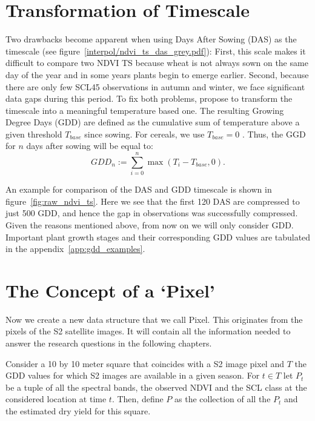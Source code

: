 \section{Transformation of Timescale}\label{sec:gdd_def}
	{%
		Two drawbacks become apparent when using Days After Sowing (DAS) as the timescale (see figure~\ref{interpol/ndvi_ts_das_grey.pdf}): First, this scale makes it difficult to compare two NDVI {TS} because wheat is not always sown on the same day of the year and in some years plants begin to emerge earlier. Second, because there are only few SCL45 observations in autumn and winter, we face significant data gaps during this period. To fix both problems, \cite{mcmasterGrowingDegreedaysOne1997} propose to transform the timescale into a meaningful temperature based one. The resulting Growing Degree Days ({GDD}) are defined as the cumulative sum of temperature above a given threshold $T_{base}$ since sowing. For cereals, we use $T_{base}=0$ \citep{holzkamperSpatialTemporalTrends2015}. Thus, the GGD for $n$ days after sowing will be equal to:
		\begin{equation}
			\label{eq:gdd}
			GDD_n := \sum_{i=0}^n \max(T_i - T_{base}, 0).
		\end{equation}

        An example for comparison of the DAS and GDD timescale is shown in figure~\ref{fig:raw_ndvi_ts}. Here we see that the first 120 DAS are compressed to just 500 GDD, and hence the gap in observations was successfully compressed. Given the reasons mentioned above, from now on we will only consider GDD. 
        Important plant growth stages and their corresponding GDD values are tabulated in the appendix~\ref{app:gdd_examples}.
	} 

\section{The Concept of a `Pixel'}{ \label{sec:gather_data_to_pixel}
	Now we create a new data structure that we call Pixel. This originates from the pixels of the S2 satellite images. It will contain all the information needed to answer the research questions in the following chapters. 
		
		Consider a 10 by 10 meter square that coincides with a S2 image pixel and $T$ the GDD values for which S2 images are available in a given season. For $t\in T$ let $P_t$ be a tuple of all the spectral bands, the observed NDVI and the SCL class at the considered location at time $t$. Then, define $P$ as the collection of all the $P_t$ and the estimated dry yield for this square.
}


